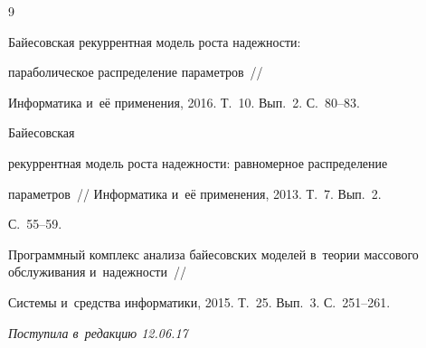 {{\begin{thebibliography}{9}




Байесовская рекуррентная модель роста надежности: 


параболическое распределение параметров~/\!\!/


Информатика и~её применения, 2016. Т.~10. Вып.~2. С.~80--83.







 Байесовская


рекуррентная модель роста надежности: равномерное распределение


параметров~/\!\!/ Информатика и~её применения, 2013. Т.~7. Вып.~2.


С.~55--59.









Программный комплекс анализа байесовских моделей в~теории массового обслуживания и~надежности~/\!\!/ 


Системы и~средства информатики, 2015. Т.~25. Вып.~3. С.~251--261.





        \end{thebibliography}


} }








\vspace*{-3pt}





\hfill{\small\textit{Поступила в~редакцию 12.06.17}}
























